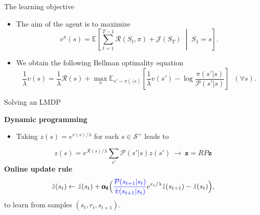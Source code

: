 \documentclass{beamer}
\theoremstyle{mystyle}
\newcommand{\cJ}{\mathcal{J}}
\newcommand{\cP}{\mathcal{P}}
\newcommand{\cR}{\mathcal{R}}
\newcommand{\cS}{\mathcal{S}}
\newcommand{\EEc}[2]{\mathbb{E}\left[#1\;\middle\lvert\;#2\right]}
\begin{document}
\begin{frame}{The learning objective}

    \begin{itemize}

        \item The aim of the agent is to maximize \[ v^\pi(s) = \EEc{\sum_{t=1}^{T-1} \cR(S_t,\pi) + \cJ(S_T)}{S_1 = s}.\]
        \item We obtain the following Bellman optimality equation
              \begin{equation*}
                  \frac 1 \lambda v(s) = \frac 1 \lambda \cR(s) + \max_\pi \mathbb{E}_{s'\sim\pi(\cdot|s)} \left[ \frac 1 \lambda v(s') - \log \frac {\pi(s'|s)} {\cP(s'|s)} \right] \;\; (\forall s).
              \end{equation*}

    \end{itemize}
\end{frame}

\begin{frame}{Solving an LMDP}

    {\bf Dynamic programming}

    \begin{itemize}
        \item Taking $z(s)=e^{v(s)/\lambda}$ for each $s\in\cS^+$ leads to
    \end{itemize}
    \[ z(s) = e^{\cR(s)/\lambda} \sum_{s'}\cP(s'|s)z(s') \   \longrightarrow \ \mathbf{z} = R P \mathbf{z}\]
    {\bf Online update rule}
    \[ \hat{z}(s_t) \leftarrow \hat{z}(s_t) + {\pmb{\alpha_t}} \Big({\color{blue} \frac {\cP(s_{t+1}|s_t)} {\hat{\pi}(s_{t+1}|s_t)}} e^{r_t/\lambda}\hat{z}(s_{t+1}) - \hat{z}(s_t) \Big), \]
    to learn from samples $(s_t, r_t, s_{t+1})$.


\end{frame}
\end{document}

